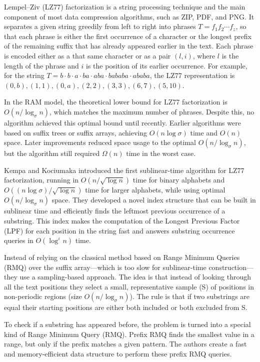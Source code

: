 Lempel–Ziv (LZ77) factorization is a string processing technique and the main component of most data compression algorithms, such as ZIP, PDF, and PNG. It separates a given string greedily from left to right into phrases \break \( T = f_1 f_2 \cdots f_z \), so that each phrase is either the first occurrence of a character or the longest prefix of the remaining suffix that has already appeared earlier in the text. Each phrase is encoded either as a that same character or as a pair \((l, i)\), where \(l\) is the length of the phrase and \(i\) is the position of its earlier occurrence. For example, for the string \( T = b \cdot b \cdot a \cdot ba \cdot aba \cdot bababa \cdot ababa \), the LZ77 representation is \((0, b), (1,1), (0, a), (2,2), (3,3), (6, 7), (5, 10)\).

In the RAM model, the theoretical lower bound for LZ77 factorization is \( O(n / \log_{\sigma} n) \), which matches the maximum number of phrases. Despite this, no algorithm achieved this optimal bound until recently.
Earlier algorithms were based on suffix trees or suffix arrays, achieving \( O(n \log \sigma) \) time and \( O(n) \) space. Later improvements reduced space usage to the optimal \( O(n / \log_{\sigma} n) \), but the algorithm still required \(\Omega (n)\) time in the worst case.

Kempa and Kociumaka introduced the first sublinear-time algorithm for LZ77 factorization, running in \( O(n / \sqrt{\log n}) \) time for binary alphabets and \break \( O((n \log \sigma) / \sqrt{\log n}) \) time for larger alphabets, while using optimal \( O(n / \log_{\sigma} n) \) space. They developed a novel index structure that can be built in sublinear time and efficiently finds the leftmost previous occurrence of a substring. This index makes the computation of the Longest Previous Factor (LPF) for each position in the string fast and answers substring occurrence queries in \( O(\log^{\varepsilon} n) \) time.

Instead of relying on the classical method based on Range Minimum Queries (RMQ) over the suffix array—which is too slow for sublinear-time construction—they use a sampling-based approach. The idea is that instead of looking through all the text positions they select a small, representative sample (S) of positions in non-periodic regions (size \(O(n / \log_{\sigma} n)\)). The rule is that if two substrings are equal their starting positions are either both included or both excluded from S.

To check if a substring has appeared before, the problem is turned into a special kind of Range Minimum Query (RMQ). Prefix RMQ finds the smallest value in a range, but only if the prefix matches a given pattern. The authors create a fast and memory-efficient data structure to perform these prefix RMQ queries.

